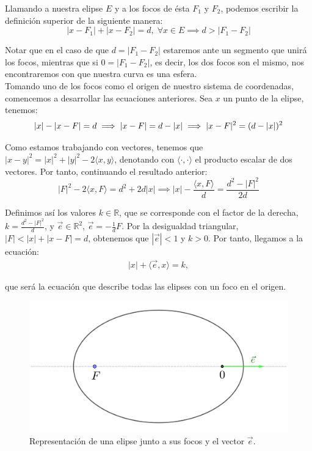\documentclass[11pt]{book}
\begin{document}
Llamando a nuestra elipse $E$ y a los focos de ésta $F_1$ y $F_2$, podemos escribir la definición superior de la siguiente manera:
\[
|x-F_1|+|x-F_2|=d, \; \forall x \in E \implies d>|F_1-F_2|
\]

Notar que en el caso de que $d=|F_1-F_2|$ estaremos ante un segmento que unirá los focos, mientras que si $0=|F_1-F_2|$, es decir, los dos focos son el mismo, nos encontraremos con que nuestra curva es una esfera.\\

Tomando uno de los focos como el origen de nuestro sistema de coordenadas, comencemos a desarrollar las ecuaciones anteriores. Sea $x$ un punto de la elipse, tenemos:
\[
|x|-|x-F|=d \implies |x-F|=d-|x| \implies |x-F|^2=(d-|x|)^2\\
\]

Como estamos trabajando con vectores, tenemos que $|x-y|^2=|x|^2+|y|^2-2\langle x,y\rangle$, denotando con $\langle\cdot,\cdot\rangle$ el producto escalar de dos vectores. Por tanto, continuando el resultado anterior:
\[
|F|^2-2\langle x,F\rangle=d^2+2d|x| \implies |x|-\frac{\langle x,F\rangle}{d}=\frac{d^2-|F|^2}{2d}
\]

Definimos así los valores $k\in\mathbb{R}$, que se corresponde con el factor de la derecha, $k=\frac{d^2-|F|^2}{d}$, y $\vec{e}\in\mathbb{R}^2$, $\vec{e}=-\frac{1}{d}F$. Por la desigualdad triangular, $|F|<|x|+|x-F|=d$, obtenemos que $|\vec{e}|<1$ y $k>0$. Por tanto, llegamos a la ecuación:
\begin{align}
|x|+\langle \vec{e},x\rangle=k,
\label{eq:elipse_cartesiana}
\end{align}

\noindent que será la ecuación que describe todas las elipses con un foco en el origen.\\

\begin{figure}[H]
\centering
\includegraphics[scale=0.12]{images/elipse_excentricidad.png}
\caption{Representación de una elipse junto a sus focos y el vector $\vec{e}$.}
\label{fig:elipse_excentricidad}
\end{figure}
\end{document}
